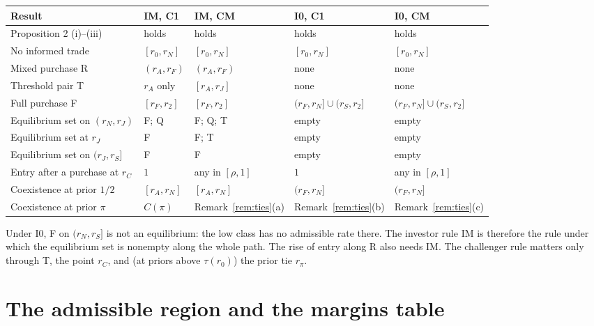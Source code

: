 \documentclass[11pt]{article}
\theoremstyle{definition}
\begin{document}
\begin{center}
\small
\begin{tabular}{@{}lllll@{}}
\toprule
Result & IM, C1 & IM, CM & I0, C1 & I0, CM\\
\midrule
Proposition 2 (i)--(iii) & holds & holds & holds & holds\\
No informed trade & $[r_0,r_N]$ & $[r_0,r_N]$ & $[r_0,r_N]$ & $[r_0,r_N]$\\
Mixed purchase R & $(r_A,r_F)$ & $(r_A,r_F)$ & none & none\\
Threshold pair T & $r_A$ only & $[r_A,r_J]$ & none & none\\
Full purchase F & $[r_F,r_2]$ & $[r_F,r_2]$ & $(r_F,r_N]\cup(r_S,r_2]$ & $(r_F,r_N]\cup(r_S,r_2]$\\
Equilibrium set on $(r_N,r_J)$ & F; Q & F; Q; T & empty & empty\\
Equilibrium set at $r_J$ & F & F; T & empty & empty\\
Equilibrium set on $(r_J,r_S]$ & F & F & empty & empty\\
Entry after a purchase at $r_C$ & $1$ & any in $[\rho,1]$ & $1$ & any in $[\rho,1]$\\
Coexistence at prior $1/2$ & $[r_A,r_N]$ & $[r_A,r_N]$ & $(r_F,r_N]$ & $(r_F,r_N]$\\
Coexistence at prior $\pi$ & $C(\pi)$ & Remark~\ref{rem:ties}(a) & Remark~\ref{rem:ties}(b) & Remark~\ref{rem:ties}(c)\\
\bottomrule
\end{tabular}
\end{center}
Under I0, F on $(r_N,r_S]$ is not an equilibrium: the low class has no admissible rate there. The investor rule
IM is therefore the rule under which the equilibrium set is nonempty along the whole path. The rise of entry along
R also needs IM. The challenger rule matters only through T, the point $r_C$, and (at priors above
$\tau(r_0)$) the prior tie $r_\pi$.

\section{The admissible region and the margins table}\label{sec:region}
\end{document}
